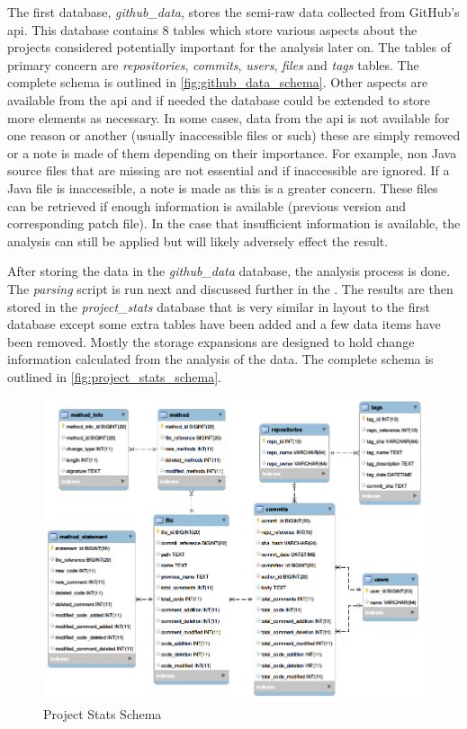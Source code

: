 The first database, \textit{github\_data}, stores the semi-raw data collected from GitHub's \gls{api}. This database contains 8 tables which store various aspects about the projects considered potentially important for the analysis later on. The tables of primary concern are \textit{repositories}, \textit{commits}, \textit{users}, \textit{files} and \textit{tags} tables. The complete schema is outlined in \autoref{fig:github_data_schema}. Other aspects are available from the \gls{api} and if needed the database could be extended to store more elements as necessary. In some cases, data from the \gls{api} is not available for one reason or another (usually inaccessible files or such) these are simply removed or a note is made of them depending on their importance. For example, non Java source files that are missing are not essential and if inaccessible are ignored. If a Java file is inaccessible, a note is made as this is a greater concern. These files can be retrieved if enough information is available (previous version and corresponding patch file). In the case that insufficient information is available, the analysis can still be applied but will likely adversely effect the result.

After storing the data in the \textit{github\_data} database, the analysis process is done. The \textit{parsing} script is run next and discussed further in the . The results are then stored in the \textit{project\_stats} database that is very similar in layout to the first database except some extra tables have been added and a few data items have been removed. Mostly the storage expansions are designed to hold change information calculated from the analysis of the data. The complete schema is outlined in \autoref{fig:project_stats_schema}.

\begin{figure}[!ht]
    \centering
        \includegraphics[width=1.0\textwidth]{images/project_stats_schema}
    \caption{Project Stats Schema}
    \label{fig:project_stats_schema}
\end{figure}

